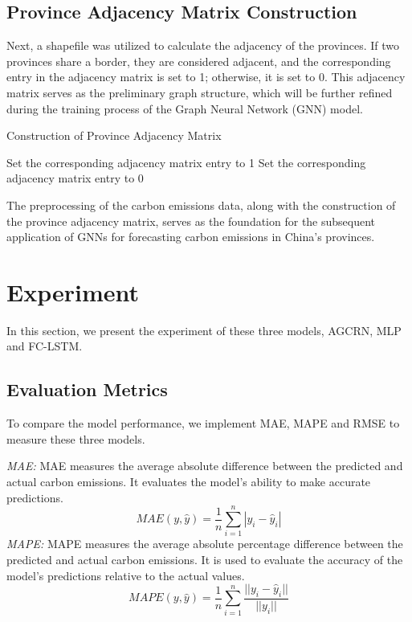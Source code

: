 \documentclass[sigconf, authordraft]{acmart}
\begin{document}
\subsection{Province Adjacency Matrix Construction}


Next, a shapefile was utilized to calculate the adjacency of the provinces. If
two provinces share a border, they are considered adjacent, and the corresponding
entry in the adjacency matrix is set to 1; otherwise, it is set to 0. This adjacency
matrix serves as the preliminary graph structure, which will be further
refined during the training process of the Graph Neural Network (GNN) model.

\begin{algorithm}
	\caption{Construction of Province Adjacency Matrix}
	\begin{algorithmic}
		[1]   \State Set the corresponding
		adjacency matrix entry to 1 \Else \State Set the corresponding adjacency matrix
		entry to 0 \EndIf \EndFor
	\end{algorithmic}
\end{algorithm}

The preprocessing of the carbon emissions data, along with the construction of
the province adjacency matrix, serves as the foundation for the subsequent application
of GNNs for forecasting carbon emissions in China's provinces.

\section{Experiment}


In this section, we present the experiment of these three models, AGCRN, MLP
and FC-LSTM.

\subsection{Evaluation Metrics }
To compare the model performance, we implement MAE, MAPE and RMSE to measure
these three models.

\emph{MAE:} MAE measures the average absolute difference between the predicted
and actual carbon emissions. It evaluates the model's ability to make accurate
predictions.
\[
	MAE(y, \hat{y}) = \frac{1}{n}\sum_{i=1}^{n}|y_{i}- \hat{y}_{i}|
\]
\emph{MAPE:} MAPE measures the average absolute percentage difference between
the predicted and actual carbon emissions. It is used to evaluate the accuracy
of the model's predictions relative to the actual values.
\[
	MAPE(y, \hat{y}) = \frac{1}{n}\sum_{i=1}^{n}\frac{||y_{i}- \hat{y}_{i}||}{||y_{i}||}
\]
\end{document}
